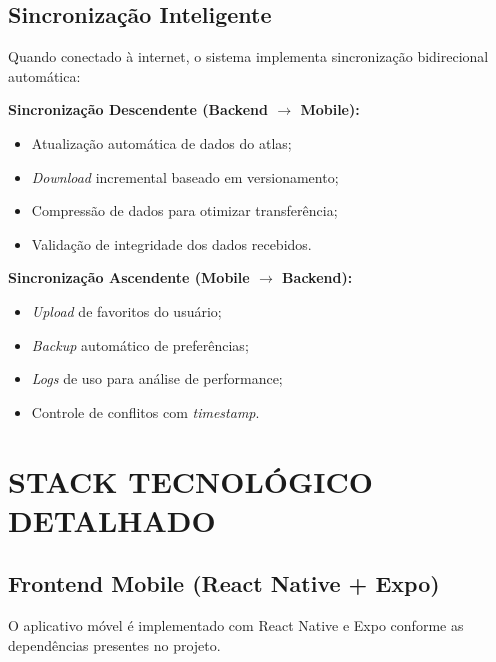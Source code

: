 \subsection{Sincronização Inteligente}

Quando conectado à internet, o sistema implementa sincronização bidirecional automática:

\textbf{Sincronização Descendente (Backend $\rightarrow$ Mobile):}
\begin{itemize}
    \item Atualização automática de dados do atlas;
    \item \textit{Download} incremental baseado em versionamento;
    \item Compressão de dados para otimizar transferência;
    \item Validação de integridade dos dados recebidos.
\end{itemize}

\textbf{Sincronização Ascendente (Mobile $\rightarrow$ Backend):}
\begin{itemize}
    \item \textit{Upload} de favoritos do usuário;
    \item \textit{Backup} automático de preferências;
    \item \textit{Logs} de uso para análise de performance;
    \item Controle de conflitos com \textit{timestamp}.
\end{itemize}

\section{STACK TECNOLÓGICO DETALHADO} \label{sec:stack}

\subsection{Frontend Mobile (React Native + Expo)}

O aplicativo móvel é implementado com React Native e Expo conforme as dependências presentes no projeto.

